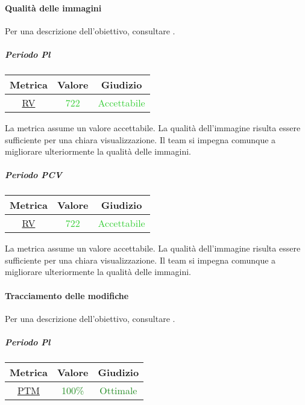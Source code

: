 					\newpage
					
			\paragraph{Qualità delle immagini}
				Per una descrizione dell'obiettivo, consultare .
				\subparagraph{Periodo Pl}
				\begin{table}[H]
					\centering
					\begin{tabular}{  c | c | c}
						\hline
						\textbf{Metrica} & \textbf{Valore} & \textbf{Giudizio} \\
						\hline
						 \hyperref[MMC]{RV}   & \textcolor{LimeGreen}{722}          & \textcolor{LimeGreen}{Accettabile} \\ \hline
					\end{tabular} 
				\end{table}
					La metrica assume un valore accettabile. La qualità dell'immagine risulta essere sufficiente per una chiara visualizzazione. Il team si impegna comunque a migliorare ulteriormente la qualità delle immagini.
				
				\subparagraph{Periodo PCV}
				\begin{table}[H]
					\centering
					\begin{tabular}{  c | c | c}
						\hline
						\textbf{Metrica} & \textbf{Valore} & \textbf{Giudizio} \\
						\hline
						\hyperref[MMC]{RV}   & \textcolor{LimeGreen}{722}          & \textcolor{LimeGreen}{Accettabile} \\ \hline
					\end{tabular} 
				\end{table}
				La metrica assume un valore accettabile. La qualità dell'immagine risulta essere sufficiente per una chiara visualizzazione. Il team si impegna comunque a migliorare ulteriormente la qualità delle immagini.
				
				\newpage
				
			\paragraph{Tracciamento delle modifiche}
				Per una descrizione dell'obiettivo, consultare .
				\subparagraph{Periodo Pl} 
				\begin{table}[H]
					\centering
					\begin{tabular}{  c | c | c}
						\hline
						\textbf{Metrica} & \textbf{Valore} & \textbf{Giudizio} \\
						\hline
						\hyperref[MMC]{PTM}   & \textcolor{ForestGreen}{100\%}          & \textcolor{ForestGreen}{Ottimale} \\ \hline
					\end{tabular} 
				\end{table}
			
